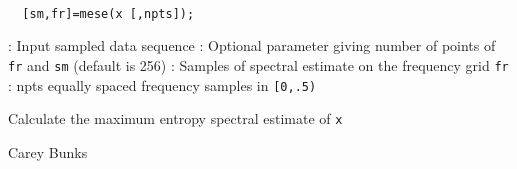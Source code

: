 
\begin{mandesc}
   \\ %
\end{mandesc}
\begin{calling_sequence}
\begin{verbatim}
  [sm,fr]=mese(x [,npts]);  
\end{verbatim}
\end{calling_sequence}
\begin{parameters}
  \begin{varlist}
    : Input sampled data sequence
    : Optional parameter giving number of points of \verb!fr! and \verb!sm! (default is 256)
    : Samples of spectral estimate on the frequency grid \verb!fr!
    : npts equally spaced frequency samples in \verb![0,.5)!
  \end{varlist}
\end{parameters}
\begin{mandescription}
  Calculate the maximum entropy spectral estimate of \verb!x!
\end{mandescription}
\begin{authors}
  Carey Bunks
\end{authors}
